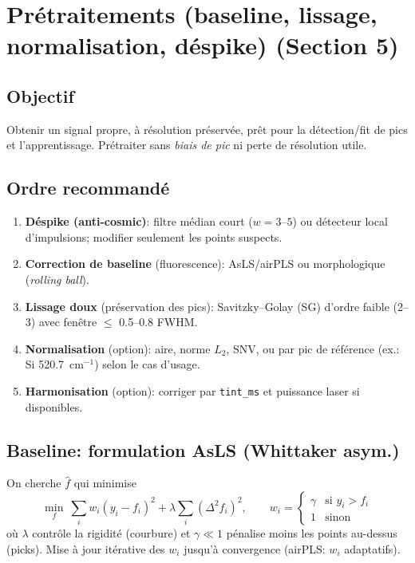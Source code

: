 
\section{Prétraitements (baseline, lissage, normalisation, déspike) (Section 5)}

\subsection{Objectif}
Obtenir un signal propre, à résolution préservée, prêt pour la détection/fit de pics et l'apprentissage. Prétraiter sans \emph{biais de pic} ni perte de résolution utile.

\subsection{Ordre recommandé}
\begin{enumerate}[nosep]
\item \textbf{Déspike (anti-cosmic)}: filtre médian court ($w=3$--$5$) ou détecteur local d'impulsions; modifier seulement les points suspects.
\item \textbf{Correction de baseline} (fluorescence): AsLS/airPLS ou morphologique (\emph{rolling ball}).
\item \textbf{Lissage doux} (préservation des pics): Savitzky--Golay (SG) d'ordre faible (2--3) avec fenêtre $\le$ 0.5--0.8 FWHM.
\item \textbf{Normalisation} (option): aire, norme $L_2$, SNV, ou par pic de référence (ex.: Si 520.7~cm$^{-1}$) selon le cas d'usage.
\item \textbf{Harmonisation} (option): corriger par \texttt{tint\_ms} et puissance laser si disponibles.
\end{enumerate}

\subsection{Baseline: formulation AsLS (Whittaker asym.)}
On cherche $\hat{f}$ qui minimise
\begin{equation}
\min_{f}\ \sum_{i} w_i (y_i - f_i)^2 + \lambda \sum_{i} (\Delta^2 f_i)^2,\qquad
w_i = \begin{cases}
\gamma & \text{si } y_i > f_i\\
1 & \text{sinon}
\end{cases}
\end{equation}
où $\lambda$ contrôle la rigidité (courbure) et $\gamma \ll 1$ pénalise moins les points au-dessus (picks). Mise à jour itérative des $w_i$ jusqu'à convergence (airPLS: $w_i$ adaptatifs).

